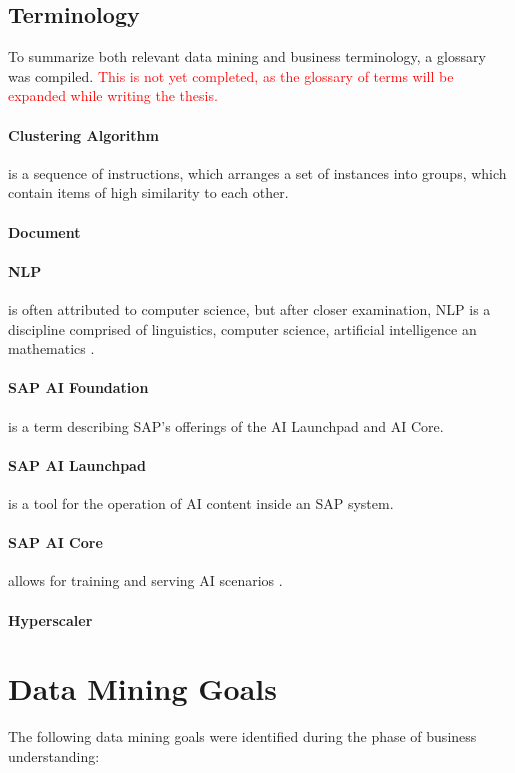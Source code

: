 \subsection{Terminology}
To summarize both relevant data mining and business terminology, a glossary was compiled.
\textcolor{red}{This is not yet completed, as the glossary of terms will be expanded while writing the thesis.}
	\paragraph{Clustering Algorithm} is a sequence of instructions, which arranges a set of instances into groups, which contain items of high similarity to each other.
	\paragraph{Document}
	\paragraph{\ac{NLP}}is often attributed to computer science, but after closer examination, \ac{NLP} is a discipline comprised of linguistics, computer science, artificial intelligence an mathematics \cite{chowdhury2003}.
	
	\paragraph{SAP AI Foundation} is a term describing SAP's offerings of the AI Launchpad and AI Core.
	\paragraph{SAP AI Launchpad} is a tool for the operation of AI content inside an SAP system.
	\paragraph{SAP AI Core} allows for training and serving AI scenarios \cite{schmitzLeonardo}.
	\paragraph{Hyperscaler}

\section{Data Mining Goals}
The following data mining goals were identified during the phase of business understanding:


